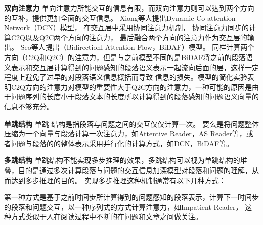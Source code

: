 \noindent \textbf{双向注意力} \quad 单向注意力所能交互的信息有限，而双向注意力则可以达到两个方向的互补，提供更加全面的交互信息。
Xiong等人提出Dynamic Co-attention Network（DCN）模型，
在交互层中采用协同注意力机制，
协同注意力同步的计算C2Q以及Q2C两个方向的注意力，
最后融合两个方向的注意力作为交互层的输出。
Seo等人提出（Bidirectionl Attention Flow，BiDAF）模型。
同样计算两个方向（C2Q和Q2C）的注意力，但是与之前模型不同的是BiDAF将之前的段落语义表示和交互层计算得到的问题感知的段落语义表示一起流向后面的层，这样一定程度上避免了过早的对段落语义信息概括而导致
信息的损失。模型的简化实验表明C2Q方向的注意力对模型的重要性大于Q2C方向的注意力，一种可能的原因是由于问题序列的长度小于段落文本的长度所以计算得到的段落感知的问题语义向量的信息不够充分。
\vspace{1ex}

\noindent \textbf{单跳结构} \quad 单跳
结构是指段落与问题之间的交互仅仅计算一次。
要么是将问题整体压缩为一个向量与段落计算一次注意力，如Attentive Reader，AS Reader等，或者问题与段落的的整体表示采用并行化的计算方式，如DCN，BiDAF等。
\vspace{1ex}

\noindent \textbf{多跳结构} \quad 单跳结构不能实现多步推理的效果，多跳结构可以视为单跳结构的堆叠，目的是通过多次计算段落与问题的交互信息加深模型对段落和问题的理解，从而达到多步推理的目的。
实现多步推理这种机制通常有以下几种方式：
\vspace{1ex}

\noindent 第一种方式是基于之前时间步所计算得到的问题感知的段落表示，计算下一时间步的段落和问题交互，以一种序列式的方式计算注意力，如Impatient Reader，
这种方式类似于人在阅读过程中不断的在问题和文章之间做关注。
\vspace{1ex}

